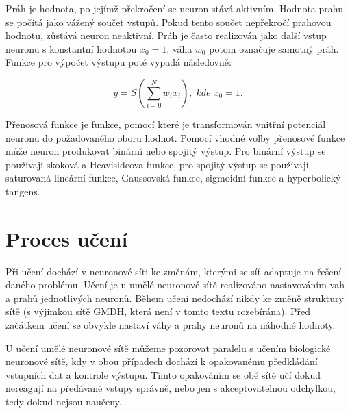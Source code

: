 \documentclass[11pt,twoside,a4paper]{book}
\begin{document}
Práh je hodnota, po jejímž překročení se neuron stává aktivním. Hodnota prahu se počítá jako vážený součet vstupů. Pokud tento součet nepřekročí prahovou hodnotu, zůstává neuron neaktivní. Práh je často realizován jako další vstup neuronu s konstantní hodnotou \begin{math} x_{0}=1\end{math}, váha \begin{math} w_{0}\end{math} potom označuje samotný práh. Funkce pro výpočet výstupu poté vypadá následovně:

\begin{equation}
  y=S(\sum\limits_{i=0}^N w_{i}x_{i}),\; kde\; x_{0}=1\mbox{.}
\end{equation}

Přenosová funkce je funkce, pomocí které je transformován vnitřní potenciál neuronu do požadovaného oboru hodnot. Pomocí vhodné volby přenosové funkce může neuron produkovat binární nebo spojitý výstup. Pro binární výstup se používají skoková a Heavisideova funkce, pro spojitý výstup se používají saturovaná lineární funkce, Gaussovská funkce, sigmoidní funkce a hyperbolický tangens.\citep{teoret}

\section{Proces učení}
Při učení dochází v neuronové síti ke změnám, kterými se síť adaptuje na řešení daného problému. Učení je u umělé neuronové sítě realizováno nastavováním vah a prahů jednotlivých neuronů. Během učení nedochází nikdy ke změně struktury sítě (s výjimkou sítě GMDH, která není v tomto textu rozebírána). Před začátkem učení se obvykle nastaví váhy a prahy neuronů na náhodné hodnoty.

U učení umělé neuronové sítě můžeme pozorovat paralelu s učením biologické neuronové sítě, kdy v obou případech dochází k opakovanému předkládání vstupních dat a kontrole výstupu. Tímto opakováním se obě sítě učí dokud nereagují na předávané vstupy správně, nebo jen s akceptovatelnou odchylkou, tedy dokud nejsou naučeny.
\end{document}
